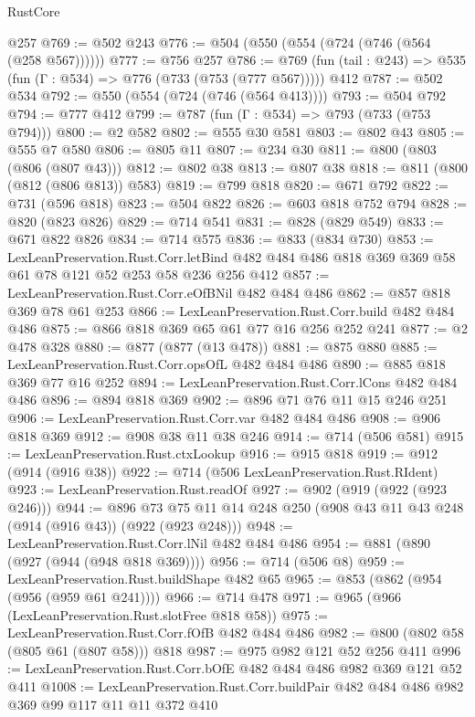\begin{lexlean}{RustCore}
\begin{coremodule}
{\begin{coremodule}
{{{{{{{    @257
@769 := @502 @243
@776 := @504 (@550 (@554 (@724 (@746 (@564 (@258 @567))))))
@777 := @756 @257
@786 := @769 (fun (tail : @243) => @535 (fun (Γ : @534) => @776 (@733 (@753 (@777 @567))))) @412
@787 := @502 @534
@792 := @550 (@554 (@724 (@746 (@564 @413))))
@793 := @504 @792
@794 := @777 @412
@799 := @787 (fun (Γ : @534) => @793 (@733 (@753 @794)))
@800 := @2 @582
@802 := @555 @30 @581
@803 := @802 @43
@805 := @555 @7 @580
@806 := @805 @11
@807 := @234 @30
@811 := @800 (@803 (@806 (@807 @43)))
@812 := @802 @38
@813 := @807 @38
@818 := @811 (@800 (@812 (@806 @813)) @583)
@819 := @799 @818
@820 := @671 @792
@822 := @731 (@596 @818)
@823 := @504 @822
@826 := @603 @818 @752 @794
@828 := @820 (@823 @826)
@829 := @714 @541
@831 := @828 (@829 @549)
@833 := @671 @822 @826
@834 := @714 @575
@836 := @833 (@834 @730)
@853 := LexLeanPreservation.Rust.Corr.letBind
    @482
    @484
    @486
    @818
    @369
    @369
    @58
    @61
    @78
    @121
    @52
    @253
    @58
    @236
    @256
    @412
@857 := LexLeanPreservation.Rust.Corr.eOfBNil @482 @484 @486
@862 := @857 @818 @369 @78 @61 @253
@866 := LexLeanPreservation.Rust.Corr.build @482 @484 @486
@875 := @866 @818 @369 @65 @61 @77 @16 @256 @252 @241
@877 := @2 @478 @328
@880 := @877 (@877 (@13 @478))
@881 := @875 @880
@885 := LexLeanPreservation.Rust.Corr.opsOfL @482 @484 @486
@890 := @885 @818 @369 @77 @16 @252
@894 := LexLeanPreservation.Rust.Corr.lCons @482 @484 @486
@896 := @894 @818 @369
@902 := @896 @71 @76 @11 @15 @246 @251
@906 := LexLeanPreservation.Rust.Corr.var @482 @484 @486
@908 := @906 @818 @369
@912 := @908 @38 @11 @38 @246
@914 := @714 (@506 @581)
@915 := LexLeanPreservation.Rust.ctxLookup
@916 := @915 @818
@919 := @912 (@914 (@916 @38))
@922 := @714 (@506 LexLeanPreservation.Rust.RIdent)
@923 := LexLeanPreservation.Rust.readOf
@927 := @902 (@919 (@922 (@923 @246)))
@944 := @896 @73 @75 @11 @14 @248 @250 (@908 @43 @11 @43 @248 (@914 (@916 @43)) (@922 (@923 @248)))
@948 := LexLeanPreservation.Rust.Corr.lNil @482 @484 @486
@954 := @881 (@890 (@927 (@944 (@948 @818 @369))))
@956 := @714 (@506 @8)
@959 := LexLeanPreservation.Rust.buildShape @482 @65
@965 := @853 (@862 (@954 (@956 (@959 @61 @241))))
@966 := @714 @478
@971 := @965 (@966 (LexLeanPreservation.Rust.slotFree @818 @58))
@975 := LexLeanPreservation.Rust.Corr.fOfB @482 @484 @486
@982 := @800 (@802 @58 (@805 @61 (@807 @58))) @818
@987 := @975 @982 @121 @52 @256 @411
@996 := LexLeanPreservation.Rust.Corr.bOfE @482 @484 @486 @982 @369 @121 @52 @411
@1008 := LexLeanPreservation.Rust.Corr.buildPair @482 @484 @486 @982 @369 @99 @117 @11 @11 @372 @410
}}}}}}}
\end{coremodule}}
\end{coremodule}
\end{lexlean}
